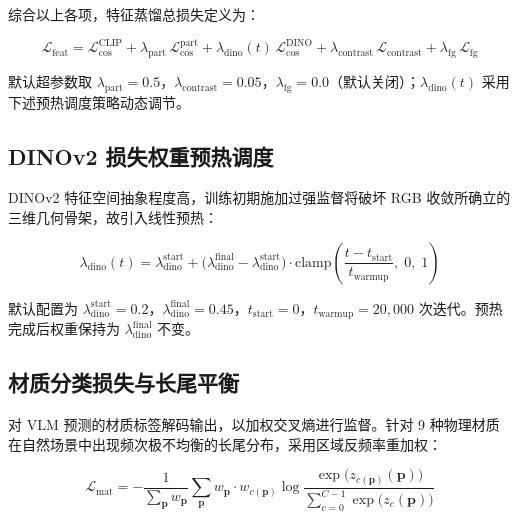 综合以上各项，特征蒸馏总损失定义为：

\begin{equation}
\mathcal{L}_{\text{feat}} = \mathcal{L}_{\text{cos}}^{\text{CLIP}} + \lambda_{\text{part}} \,\mathcal{L}_{\text{cos}}^{\text{part}} + \lambda_{\text{dino}}(t) \,\mathcal{L}_{\text{cos}}^{\text{DINO}} + \lambda_{\text{contrast}} \,\mathcal{L}_{\text{contrast}} + \lambda_{\text{fg}} \,\mathcal{L}_{\text{fg}}
\label{eq:feat_total}
\end{equation}

默认超参数取 $\lambda_{\text{part}} = 0.5$，$\lambda_{\text{contrast}} = 0.05$，$\lambda_{\text{fg}} = 0.0$（默认关闭）；$\lambda_{\text{dino}}(t)$ 采用下述预热调度策略动态调节。

\subsection{DINOv2 损失权重预热调度}

DINOv2 特征空间抽象程度高，训练初期施加过强监督将破坏 RGB 收敛所确立的三维几何骨架，故引入线性预热：

\begin{equation}
\lambda_{\text{dino}}(t) = \lambda_{\text{dino}}^{\text{start}} + \big( \lambda_{\text{dino}}^{\text{final}} - \lambda_{\text{dino}}^{\text{start}} \big) \cdot \mathrm{clamp}\!\left( \frac{t - t_{\text{start}}}{t_{\text{warmup}}},\; 0,\; 1 \right)
\label{eq:dino_warmup}
\end{equation}

默认配置为 $\lambda_{\text{dino}}^{\text{start}} = 0.2$，$\lambda_{\text{dino}}^{\text{final}} = 0.45$，$t_{\text{start}} = 0$，$t_{\text{warmup}} = 20{,}000$ 次迭代。预热完成后权重保持为 $\lambda_{\text{dino}}^{\text{final}}$ 不变。

\subsection{材质分类损失与长尾平衡}

对 VLM 预测的材质标签解码输出，以加权交叉熵进行监督。针对 9 种物理材质在自然场景中出现频次极不均衡的长尾分布，采用区域反频率重加权：

\begin{equation}
\mathcal{L}_{\text{mat}} = -\frac{1}{\sum_{\mathbf{p}} w_{\mathbf{p}}} \sum_{\mathbf{p}} w_{\mathbf{p}} \cdot w_{c(\mathbf{p})} \log \frac{\exp\!\big( z_{c(\mathbf{p})}(\mathbf{p}) \big)}{\sum_{c=0}^{C-1} \exp\!\big( z_{c}(\mathbf{p}) \big)}
\label{eq:mat_loss}
\end{equation}

